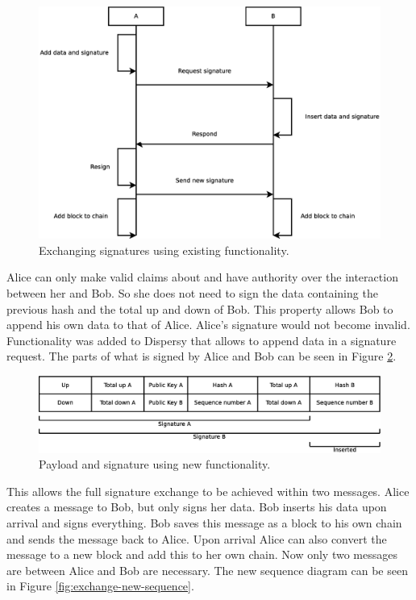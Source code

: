 \begin{figure}
	\centerline{\includegraphics[scale=0.3]{design/figs/exchange_old.eps}}
	\caption{Exchanging signatures using existing functionality.}
	\label{fig:exchange-old-sequence}
\end{figure}

Alice can only make valid claims about and have authority over the interaction between her and Bob.
So she does not need to sign the data containing the previous hash and the total up and down of Bob.
This property allows Bob to append his own data to that of Alice.
Alice's signature would not become invalid.
Functionality was added to Dispersy that allows to append data in a signature request.
The parts of what is signed by Alice and Bob can be seen in Figure \ref{fig:payload-signature-new}.

\begin{figure}
	\centerline{\includegraphics[scale=0.3]{design/figs/signature_new.eps}}
	\caption{Payload and signature using new functionality.}
	\label{fig:payload-signature-new}
\end{figure}

This allows the full signature exchange to be achieved within two messages.
Alice creates a message to Bob, but only signs her data.
Bob inserts his data upon arrival and signs everything.
Bob saves this message as a block to his own chain
and sends the message back to Alice.
Upon arrival Alice can also convert the message to a new block and add this to her own chain.
Now only two messages are between Alice and Bob are necessary.
The new sequence diagram can be seen in Figure \ref{fig:exchange-new-sequence}.

